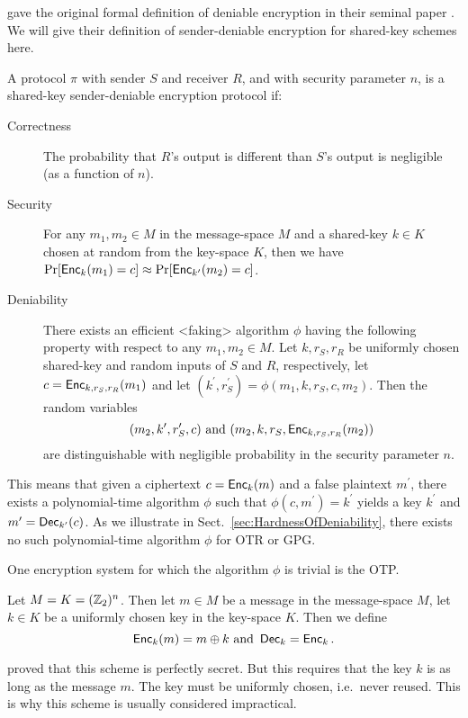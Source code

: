 \citeauthor{deniablecrypt} gave the original formal definition of deniable 
encryption in their seminal paper \cite{deniablecrypt}.
We will give their definition of sender-deniable encryption for shared-key 
schemes here.
\begin{definition}
  \label{def:DeniableEnc}
  A protocol \(\pi\) with sender \(S\) and receiver \(R\), and with security 
  parameter \(n\), is a shared-key sender-deniable encryption protocol if:
  \begin{description}
    \item[Correctness] The probability that \(R\)'s output is different than 
      \(S\)'s output is negligible (as a function of \(n\)).

    \item[Security] For any \(m_1, m_2\in M\) in the message-space \(M\) and 
      a shared-key \(k\in K\) chosen at random from the key-space \(K\), then 
      we have \(\Pr[ \operatorname{\mathsf{Enc}}_k( m_1 ) = c ] \approx \Pr[ \operatorname{\mathsf{Enc}}_{k^\prime}( m_2 
      ) = c ]\).

    \item[Deniability] There exists an efficient <faking> algorithm \(\phi\) 
      having the following property with respect to any \(m_1, m_2\in M\).
      Let \(k, r_S, r_R\) be uniformly chosen shared-key and random inputs of 
      \(S\) and \(R\), respectively, let \(c = \operatorname{\mathsf{Enc}}_{k, r_S, r_R}( m_1 )\) and 
      let \((k^\prime, r_S^\prime) = \phi( m_1, k, r_S, c, m_2 )\).
      Then the random variables \[
        ( m_2, k^\prime, r_S^\prime, c ) \text{ and }
        ( m_2, k, r_S, \operatorname{\mathsf{Enc}}_{k, r_S, r_R}( m_2 ) )
      \] are distinguishable with negligible probability in the security 
      parameter \(n\).
  \end{description}
\end{definition}
This means that given a ciphertext \(c = \operatorname{\mathsf{Enc}}_k( m )\) and a false plaintext 
\(m^\prime\), there exists a polynomial-time algorithm \(\phi\) such that 
\(\phi( c, m^\prime ) = k^\prime\) yields a key \(k^\prime\) and \(m^\prime 
= \operatorname{\mathsf{Dec}}_{k^\prime}( c )\).
As we illustrate in Sect.~\ref{sec:HardnessOfDeniability}, there exists no such 
polynomial-time algorithm \(\phi\) for \ac{OTR} or \ac{GPG}.

One encryption system for which the algorithm \(\phi\) is trivial is the 
\ac{OTP}.
\begin{definition}
  \label{def:OTP}
  Let \(M = K = (\mathbb Z_2)^n\).
  Then let \(m\in M\) be a message in the message-space \(M\), let \(k\in K\) 
  be a uniformly chosen key in the key-space \(K\).
  Then we define \[
    \operatorname{\mathsf{Enc}}_k( m ) = m\oplus k \text{ and } \operatorname{\mathsf{Dec}}_k = \operatorname{\mathsf{Enc}}_k.
  \]
\end{definition}
\citet{ShannonSecrecy} proved that this scheme is perfectly secret.
But this requires that the key \(k\) is as long as the message \(m\).
The key must be uniformly chosen, i.e.~never reused.
This is why this scheme is usually considered impractical.

